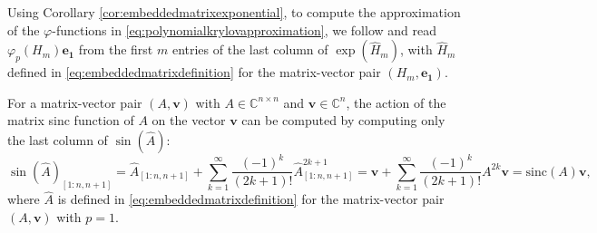 Using Corollary \ref{cor:embeddedmatrixexponential}, to compute the approximation
of the $\varphi$-functions in \eqref{eq:polynomialkrylovapproximation},
we follow \cite{niesen2012} and read $\varphi_p(H_m) \mathbf{e_1}$ from the first $m$ entries
of the last column of $\exp(\hat{H}_m)$, with $\hat{H}_m$ defined in
\eqref{eq:embeddedmatrixdefinition} for the matrix-vector pair $(H_m, \mathbf{e_1})$.

\begin{corollary}
    \label{cor:embeddedmatrixsinc}
    For a matrix-vector pair $(A, \mathbf{v})$ with $A \in \mathbb{C}^{n \times n}$ and
    $\mathbf{v} \in \mathbb{C}^n$, the action of the matrix sinc function
    of $A$ on the vector $\mathbf{v}$ can be computed by computing only the last
    column of $\sin(\hat{A})$:
    \begin{equation*}
        \sin(\hat{A})_{[1 : n, n+1]}
        = \hat{A}_{[1 : n, n+1]} + \sum_{k=1}^{\infty}{\frac{(-1)^k}{(2k+1)!} \hat{A}_{[1 : n, n+1]}^{2k+1}}
        = \mathbf{v} + \sum_{k=1}^{\infty}{\frac{(-1)^k}{(2k+1)!} A^{2k} \mathbf{v}} = \mathrm{sinc}(A)\mathbf{v},
    \end{equation*}
    where $\hat{A}$ is defined in \eqref{eq:embeddedmatrixdefinition} for the matrix-vector
    pair $(A, \mathbf{v})$ with $p=1$.
\end{corollary}


